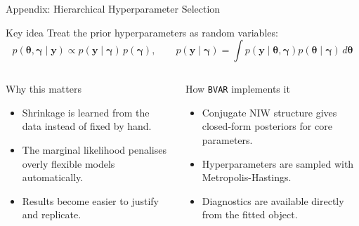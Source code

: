 \documentclass[10pt, aspectratio=169]{beamer}
\begin{document}
\begin{frame}{Appendix: Hierarchical Hyperparameter Selection}
\small
\begin{block}{Key idea}
Treat the prior hyperparameters as random variables:
\[
  p(\boldsymbol{\theta}, \boldsymbol{\gamma} \mid \boldsymbol{y})
  \propto
  p(\boldsymbol{y} \mid \boldsymbol{\gamma})\,
  p(\boldsymbol{\gamma}),
  \qquad
  p(\boldsymbol{y} \mid \boldsymbol{\gamma})
  =
  \int
  p(\boldsymbol{y} \mid \boldsymbol{\theta}, \boldsymbol{\gamma})
  p(\boldsymbol{\theta} \mid \boldsymbol{\gamma})
  \, d\boldsymbol{\theta}
\]
\end{block}

\begin{columns}[T,onlytextwidth]
  \begin{block}{Why this matters}
  \begin{itemize}
    \item Shrinkage is learned from the data instead of fixed by hand.
    \item The marginal likelihood penalises overly flexible models automatically.
    \item Results become easier to justify and replicate.
  \end{itemize}
  \end{block}

  \begin{block}{How \texttt{BVAR} implements it}
  \begin{itemize}
    \item Conjugate NIW structure gives closed-form posteriors for core parameters.
    \item Hyperparameters are sampled with Metropolis-Hastings.
    \item Diagnostics are available directly from the fitted object.
  \end{itemize}
  \end{block}
\end{columns}
\end{frame}
\end{document}
